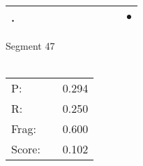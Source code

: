\documentclass[landscape]{article}
\newcommand{\ssp}{\hspace{2pt}}
\newcommand{\mex}{\cellcolor{g}$\bullet$}
\begin{document}
\begin{tabular}{|l|p{10pt}|p{10pt}|p{10pt}|p{10pt}|p{10pt}|p{10pt}|p{10pt}|p{10pt}|p{10pt}|p{10pt}|}
\hline
\ssp \cellcolor{ref9}. \ssp&\hspace{2pt}&\hspace{2pt}&\hspace{2pt}&\hspace{2pt}&\hspace{2pt}&\hspace{2pt}&\hspace{2pt}&\hspace{2pt}&\hspace{2pt}&\hspace{2pt}\mex\\
\hline
\end{tabular}

\vspace{6pt}
\noindent Segment 47\\\\
\noindent\begin{tabular}{lm{12pt}r}
\hline
P:&&0.294\\
R:&&0.250\\
Frag:&&0.600\\
Score:&&0.102\\
\end{tabular}

\newpage
\end{document}
